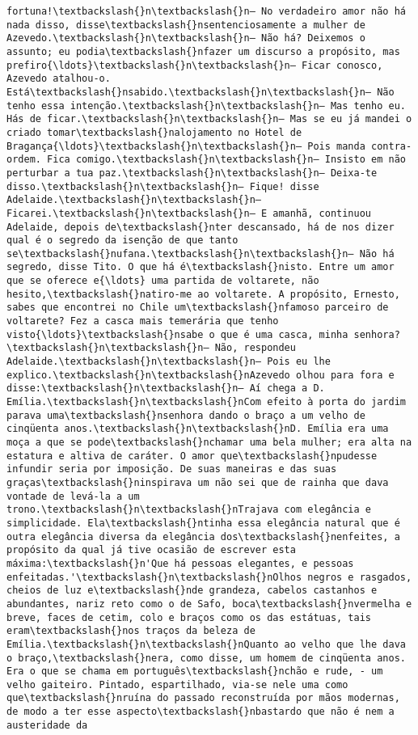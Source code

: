 \documentclass[11pt]{article}
\begin{document}
\begin{Verbatim}[commandchars=\\\{\}]
fortuna!\textbackslash{}n\textbackslash{}n— No verdadeiro amor não há nada disso, disse\textbackslash{}nsentenciosamente a mulher de Azevedo.\textbackslash{}n\textbackslash{}n— Não há? Deixemos o assunto; eu podia\textbackslash{}nfazer um discurso a propósito, mas prefiro{\ldots}\textbackslash{}n\textbackslash{}n— Ficar conosco, Azevedo atalhou-o. Está\textbackslash{}nsabido.\textbackslash{}n\textbackslash{}n— Não tenho essa intenção.\textbackslash{}n\textbackslash{}n— Mas tenho eu. Hás de ficar.\textbackslash{}n\textbackslash{}n— Mas se eu já mandei o criado tomar\textbackslash{}nalojamento no Hotel de Bragança{\ldots}\textbackslash{}n\textbackslash{}n— Pois manda contra-ordem. Fica comigo.\textbackslash{}n\textbackslash{}n— Insisto em não perturbar a tua paz.\textbackslash{}n\textbackslash{}n— Deixa-te disso.\textbackslash{}n\textbackslash{}n— Fique! disse Adelaide.\textbackslash{}n\textbackslash{}n— Ficarei.\textbackslash{}n\textbackslash{}n— E amanhã, continuou Adelaide, depois de\textbackslash{}nter descansado, há de nos dizer qual é o segredo da isenção de que tanto se\textbackslash{}nufana.\textbackslash{}n\textbackslash{}n— Não há segredo, disse Tito. O que há é\textbackslash{}nisto. Entre um amor que se oferece e{\ldots} uma partida de voltarete, não hesito,\textbackslash{}natiro-me ao voltarete. A propósito, Ernesto, sabes que encontrei no Chile um\textbackslash{}nfamoso parceiro de voltarete? Fez a casca mais temerária que tenho visto{\ldots}\textbackslash{}nsabe o que é uma casca, minha senhora?\textbackslash{}n\textbackslash{}n— Não, respondeu Adelaide.\textbackslash{}n\textbackslash{}n— Pois eu lhe explico.\textbackslash{}n\textbackslash{}nAzevedo olhou para fora e disse:\textbackslash{}n\textbackslash{}n— Aí chega a D. Emília.\textbackslash{}n\textbackslash{}nCom efeito à porta do jardim parava uma\textbackslash{}nsenhora dando o braço a um velho de cinqüenta anos.\textbackslash{}n\textbackslash{}nD. Emília era uma moça a que se pode\textbackslash{}nchamar uma bela mulher; era alta na estatura e altiva de caráter. O amor que\textbackslash{}npudesse infundir seria por imposição. De suas maneiras e das suas graças\textbackslash{}ninspirava um não sei que de rainha que dava vontade de levá-la a um trono.\textbackslash{}n\textbackslash{}nTrajava com elegância e simplicidade. Ela\textbackslash{}ntinha essa elegância natural que é outra elegância diversa da elegância dos\textbackslash{}nenfeites, a propósito da qual já tive ocasião de escrever esta máxima:\textbackslash{}n'Que há pessoas elegantes, e pessoas enfeitadas.'\textbackslash{}n\textbackslash{}nOlhos negros e rasgados, cheios de luz e\textbackslash{}nde grandeza, cabelos castanhos e abundantes, nariz reto como o de Safo, boca\textbackslash{}nvermelha e breve, faces de cetim, colo e braços como os das estátuas, tais eram\textbackslash{}nos traços da beleza de Emília.\textbackslash{}n\textbackslash{}nQuanto ao velho que lhe dava o braço,\textbackslash{}nera, como disse, um homem de cinqüenta anos. Era o que se chama em português\textbackslash{}nchão e rude, - um velho gaiteiro. Pintado, espartilhado, via-se nele uma como que\textbackslash{}nruína do passado reconstruída por mãos modernas, de modo a ter esse aspecto\textbackslash{}nbastardo que não é nem a austeridade da 
\end{Verbatim}
\end{document}
